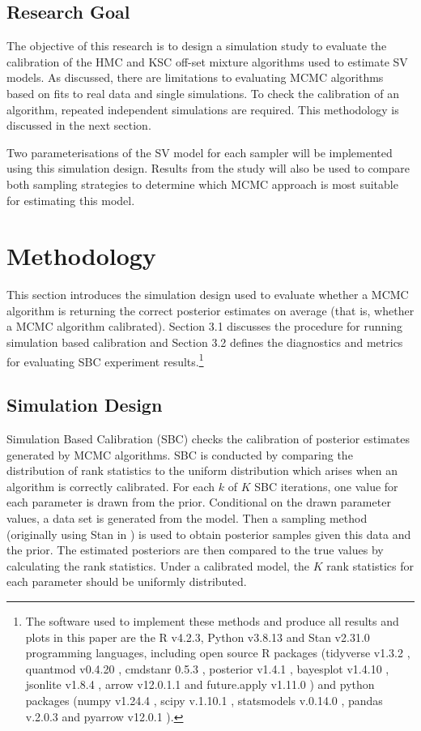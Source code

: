 \documentclass[12pt, a4paper]{article}
\begin{document}
\subsection{Research Goal}
    The objective of this research is to design a simulation study to evaluate the calibration of the HMC and KSC off-set mixture algorithms used to estimate SV models. As discussed, there are limitations to evaluating MCMC algorithms based on fits to real data and single simulations. To check the calibration of an algorithm, repeated independent simulations are required. This methodology is discussed in the next section. 

    Two parameterisations of the SV model for each sampler will be implemented using this simulation design. Results from the study will also be used to compare both sampling strategies to determine which MCMC approach is most suitable for estimating this model. 

\section{Methodology}
This section introduces the simulation design used to evaluate whether a MCMC algorithm is returning the correct posterior estimates on average (that is, whether a MCMC algorithm calibrated). Section 3.1 discusses the procedure for running simulation based calibration and Section 3.2 defines the diagnostics and metrics for evaluating SBC experiment results.\footnote{The software used to implement these methods and produce all results and plots in this paper are the R v4.2.3\citep{rlang}, Python v3.8.13 \citep{10.5555/1593511} and Stan v2.31.0 \citep{stan} programming languages, including open source R packages (tidyverse v1.3.2 \citep{tidyverse}, quantmod v0.4.20 \citep{quantmod}, cmdstanr 0.5.3 \citep{cmdstanr}, posterior v1.4.1 \citep{posteriorr}, bayesplot v1.4.10 \citep{bayesplot}, jsonlite v1.8.4 \citep{jsonlite}, arrow v12.0.1.1 \citep{arrow} and future.apply v1.11.0 \citep{RJ-2021-048}) and python packages (numpy v1.24.4 \citep{harris2020array}, scipy v.1.10.1 \citep{2020SciPy-NMeth}, statsmodels v.0.14.0 \citep{seabold2010statsmodels}, pandas v.2.0.3 \citep{mckinney-proc-scipy-2010} and pyarrow v12.0.1 \citep{arrow}).}

    \subsection{Simulation Design}
        Simulation Based Calibration (SBC) checks the calibration of posterior estimates generated by MCMC algorithms. SBC is conducted by comparing the distribution of rank statistics to the uniform distribution which arises when an algorithm is correctly calibrated. For each $k$ of $K$ SBC iterations, one value for each parameter is drawn from the prior. Conditional on the drawn parameter values, a data set is generated from the model. Then a sampling method (originally using Stan in \citet{talts2020validating}) is used to obtain posterior samples given this data and the prior. The estimated posteriors are then compared to the true values by calculating the rank statistics. Under a calibrated model, the $K$ rank statistics for each parameter should be uniformly distributed. 
\end{document}
